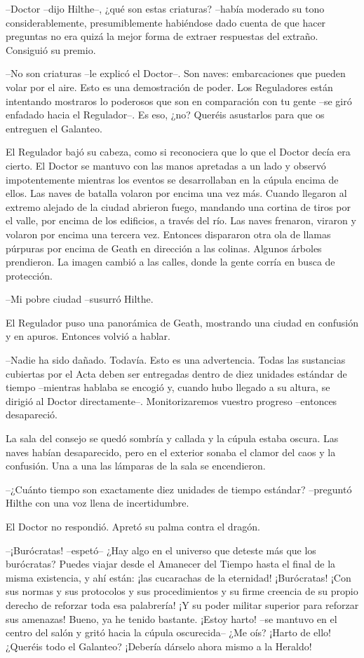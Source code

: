 {--Doctor --dijo Hilthe--, ¿qué son estas criaturas? --había moderado
	su tono considerablemente, presumiblemente habiéndose dado cuenta de que
	hacer preguntas no era quizá la mejor forma de extraer respuestas del
extraño. Consiguió su premio.}

{--No son criaturas --le explicó el Doctor--. Son naves: embarcaciones
	que pueden volar por el aire. Esto es una demostración de poder. Los
	Reguladores están intentando mostraros lo poderosos que son en
	comparación con tu gente --se giró enfadado hacia el Regulador--. Es
eso, ¿no? Queréis asustarlos para que os entreguen el Galanteo.}

{El Regulador bajó su cabeza, como si reconociera que lo que el Doctor
	decía era cierto. El Doctor se mantuvo con las manos apretadas a un lado
	y observó impotentemente mientras los eventos se desarrollaban en la
	cúpula encima de ellos. Las naves de batalla volaron por encima una vez
	más. Cuando llegaron al extremo alejado de la ciudad abrieron fuego,
	mandando una cortina de tiros por el valle, por encima de los edificios,
	a través del río. Las naves frenaron, viraron y volaron por encima una
	tercera vez. Entonces dispararon otra ola de llamas púrpuras por encima
	de Geath en dirección a las colinas. Algunos árboles prendieron. La
	imagen cambió a las calles, donde la gente corría en busca de
protección.}

{--Mi pobre ciudad --susurró Hilthe.}

{El Regulador puso una panorámica de Geath, mostrando una ciudad en
confusión y en apuros. Entonces volvió a hablar.}

{--Nadie ha sido dañado. Todavía. Esto es una advertencia. Todas las
	sustancias cubiertas por el Acta deben ser entregadas dentro de diez
	unidades estándar de tiempo --mientras hablaba se encogió y, cuando hubo
	llegado a su altura, se dirigió al Doctor directamente--.
Monitorizaremos vuestro progreso --entonces desapareció.}

{La sala del consejo se quedó sombría y callada y la cúpula estaba
	oscura. Las naves habían desaparecido, pero en el exterior sonaba el
	clamor del caos y la confusión. Una a una las lámparas de la sala se
encendieron.}

{--¿Cuánto tiempo son exactamente diez unidades de tiempo estándar?
--preguntó Hilthe con una voz llena de incertidumbre.}

{El Doctor no respondió. Apretó su palma contra el dragón.}

{--¡Burócratas! --espetó-- ¿Hay algo en el universo que deteste más
	que los burócratas? Puedes viajar desde el Amanecer del Tiempo hasta el
	final de la misma existencia, y ahí están: ¡las cucarachas de la
	eternidad! ¡Burócratas! ¡Con sus normas y sus protocolos y sus
	procedimientos y su firme creencia de su propio derecho de reforzar toda
	esa palabrería! ¡Y su poder militar superior para reforzar sus amenazas!
	Bueno, ya he tenido bastante. ¡Estoy harto! --se mantuvo en el centro
	del salón y gritó hacia la cúpula oscurecida-- ¿Me oís? ¡Harto de ello!
¿Queréis todo el Galanteo? ¡Debería dárselo ahora mismo a la Heraldo!}

